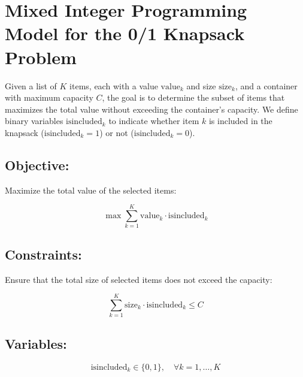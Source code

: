 \documentclass{article}
\begin{document}
\section*{Mixed Integer Programming Model for the 0/1 Knapsack Problem}

Given a list of \(K\) items, each with a value \( \text{value}_k \) and size \( \text{size}_k \), and a container with maximum capacity \( C \), the goal is to determine the subset of items that maximizes the total value without exceeding the container's capacity. We define binary variables \( \text{isincluded}_k \) to indicate whether item \( k \) is included in the knapsack (\(\text{isincluded}_k = 1\)) or not (\(\text{isincluded}_k = 0\)).

\subsection*{Objective:}
Maximize the total value of the selected items:

\[
\max \sum_{k=1}^{K} \text{value}_k \cdot \text{isincluded}_k
\]

\subsection*{Constraints:}
Ensure that the total size of selected items does not exceed the capacity:

\[
\sum_{k=1}^{K} \text{size}_k \cdot \text{isincluded}_k \leq C
\]

\subsection*{Variables:}
\[
\text{isincluded}_k \in \{0, 1\}, \quad \forall k = 1, \ldots, K
\]
\end{document}
